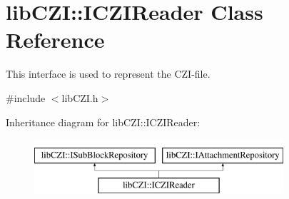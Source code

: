 \hypertarget{classlib_c_z_i_1_1_i_c_z_i_reader}{}\section{lib\+C\+ZI\+:\+:I\+C\+Z\+I\+Reader Class Reference}
\label{classlib_c_z_i_1_1_i_c_z_i_reader}


This interface is used to represent the C\+Z\+I-\/file.  




{\ttfamily \#include $<$lib\+C\+Z\+I.\+h$>$}

Inheritance diagram for lib\+C\+ZI\+:\+:I\+C\+Z\+I\+Reader\+:\begin{figure}[H]
\begin{center}
\leavevmode
\includegraphics[height=2.000000cm]{classlib_c_z_i_1_1_i_c_z_i_reader}
\end{center}
\end{figure}
